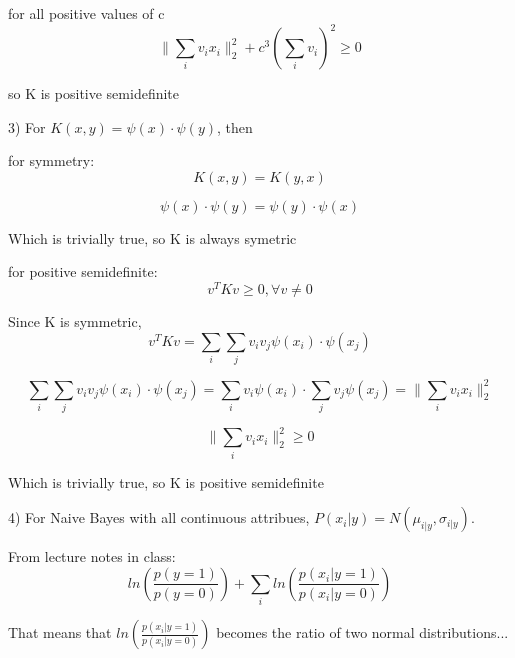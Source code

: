 \documentclass[12pt]{article}
\begin{document}
for all positive values of c
\begin{equation}
    \parallel\sum_i v_ix_i\parallel_2^2 + c^3(\sum_i v_i) ^2 \geq 0
\end{equation}

so K is positive semidefinite

\pagebreak
\setcounter{equation}{0}
3) For $K(x,y) = \psi(x)\cdot \psi(y)$, then

for symmetry: 
\begin{equation}
    K(x,y) = K(y,x) 
\end{equation}

\begin{equation}
    \psi(x)\cdot \psi(y) = \psi(y)\cdot \psi(x)
\end{equation}

Which is trivially true, so K is always symetric

for positive semidefinite: 
\begin{equation}
    v^T K v \geq 0, \forall v\neq 0
\end{equation}

Since K is symmetric, 
\begin{equation}
    v^T K v = \sum_i \sum_j v_iv_j\psi(x_i)\cdot \psi(x_j)
\end{equation}

\begin{equation}
    \sum_i \sum_j v_iv_j\psi(x_i)\cdot \psi(x_j) = \sum_i v_i\psi(x_i) \cdot \sum_j v_j\psi(x_j) = \parallel \sum_i v_ix_i \parallel_2^2
\end{equation}

\begin{equation}
    \parallel \sum_i v_ix_i \parallel_2^2 \geq 0
\end{equation}

Which is trivially true, so K is positive semidefinite




\pagebreak
\setcounter{equation}{0}
4) For Naive Bayes with all continuous attribues, $P(x_i|y) = N(\mu_{i|y},\sigma_{i|y})$.

From lecture notes in class: 
\begin{equation}
    ln(\frac{p(y=1)}{p(y=0)} ) + \sum_i ln( \frac{p(x_i|y=1)}{p(x_i|y=0)} )
\end{equation}

That means that $ln( \frac{p(x_i|y=1)}{p(x_i|y=0)} )$ becomes the ratio of 
two normal distributions... 
\end{document}
